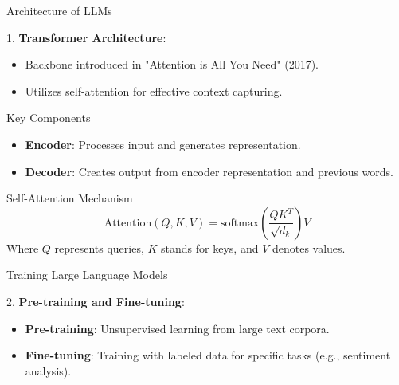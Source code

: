 \documentclass[aspectratio=169]{beamer}
\begin{document}
\begin{frame}[fragile]{Architecture of LLMs}

1. \textbf{Transformer Architecture}:
   \begin{itemize}
       \item Backbone introduced in "Attention is All You Need" (2017).
       \item Utilizes self-attention for effective context capturing.
   \end{itemize}
   
   \begin{block}{Key Components}
        \begin{itemize}
            \item \textbf{Encoder}: Processes input and generates representation.
            \item \textbf{Decoder}: Creates output from encoder representation and previous words.
        \end{itemize}
   \end{block}

\begin{block}{Self-Attention Mechanism}
\begin{equation}
\text{Attention}(Q, K, V) = \text{softmax}\left(\frac{QK^T}{\sqrt{d_k}}\right)V
\end{equation}
Where \(Q\) represents queries, \(K\) stands for keys, and \(V\) denotes values.

\end{block}

\end{frame}

\begin{frame}[fragile]{Training Large Language Models}

2. \textbf{Pre-training and Fine-tuning}:
   \begin{itemize}
       \item \textbf{Pre-training}: Unsupervised learning from large text corpora.
       \item \textbf{Fine-tuning}: Training with labeled data for specific tasks (e.g., sentiment analysis).
   \end{itemize}

\end{frame}
\end{document}
